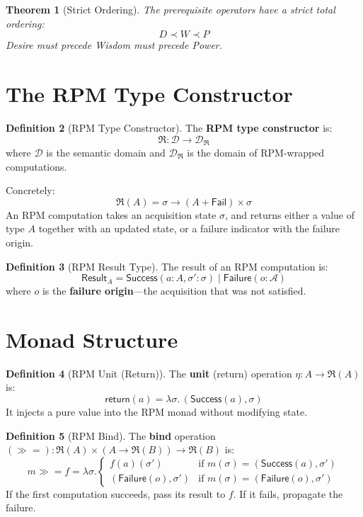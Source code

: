 \documentclass[11pt,twoside,openright]{book}
\theoremstyle{definition}
\newtheorem{definition}{Definition}[chapter]
\theoremstyle{plain}
\newtheorem{theorem}[definition]{Theorem}
\theoremstyle{remark}
\newcommand{\Acquisitions}{\mathcal{A}}
\newcommand{\RPM}{\mathfrak{R}}
\newcommand{\rpmret}{\mathsf{return}}
\newcommand{\rpmbind}{\mathbin{\gg\!=}}
\newcommand{\AcqState}{\sigma}
\newcommand{\Failed}{\mathsf{Fail}}
\begin{document}
\begin{theorem}[Strict Ordering]
\label{thm:prereq-order}
The prerequisite operators have a strict total ordering:
\[
D \prec W \prec P
\]
Desire must precede Wisdom must precede Power.
\end{theorem}

\section{The RPM Type Constructor}

\begin{definition}[RPM Type Constructor]
\label{def:rpm-type}
The \textbf{RPM type constructor} is:
\[
\RPM : \mathcal{D} \to \mathcal{D}_\RPM
\]
where $\mathcal{D}$ is the semantic domain and $\mathcal{D}_\RPM$ is the domain of RPM-wrapped computations.

Concretely:
\[
\RPM(A) = \AcqState \to (A + \Failed) \times \AcqState
\]
An RPM computation takes an acquisition state $\AcqState$, and returns either a value of type $A$ together with an updated state, or a failure indicator with the failure origin.
\end{definition}

\begin{definition}[RPM Result Type]
\label{def:rpm-result}
The result of an RPM computation is:
\[
\mathsf{Result}_A = \mathsf{Success}(a : A, \sigma' : \AcqState) \mid \mathsf{Failure}(o : \Acquisitions)
\]
where $o$ is the \textbf{failure origin}---the acquisition that was not satisfied.
\end{definition}

\section{Monad Structure}

\begin{definition}[RPM Unit (Return)]
\label{def:rpm-unit}
The \textbf{unit} (return) operation $\eta : A \to \RPM(A)$ is:
\[
\rpmret(a) = \lambda \sigma. \, (\mathsf{Success}(a), \sigma)
\]
It injects a pure value into the RPM monad without modifying state.
\end{definition}

\begin{definition}[RPM Bind]
\label{def:rpm-bind}
The \textbf{bind} operation $(\rpmbind) : \RPM(A) \times (A \to \RPM(B)) \to \RPM(B)$ is:
\[
m \rpmbind f = \lambda \sigma. \begin{cases}
f(a)(\sigma') & \text{if } m(\sigma) = (\mathsf{Success}(a), \sigma') \\
(\mathsf{Failure}(o), \sigma') & \text{if } m(\sigma) = (\mathsf{Failure}(o), \sigma')
\end{cases}
\]
If the first computation succeeds, pass its result to $f$. If it fails, propagate the failure.
\end{definition}
\end{document}
